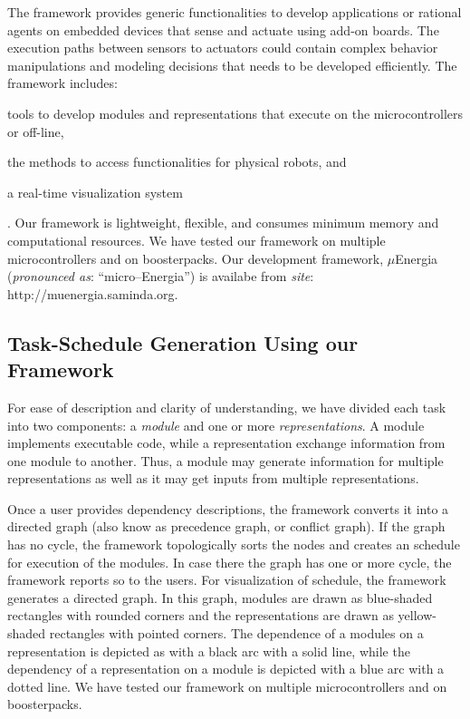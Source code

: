 \documentclass{IEEEtran}
\begin{document}
\par
The framework provides generic functionalities to develop applications or rational agents 
on embedded devices that sense and actuate using add-on boards. The execution paths between sensors 
to actuators could contain complex behavior manipulations and modeling decisions that needs to be 
developed efficiently.
The framework 
includes: \begin{inparaenum}[($i$)] \item tools to develop modules and representations that execute on 
the microcontrollers or off-line, \item the methods to access functionalities for physical robots, 
and \item a real-time visualization system\end{inparaenum}. Our framework is lightweight, flexible, 
and consumes minimum memory and computational resources. We have tested our framework on multiple 
microcontrollers and on boosterpacks. 
Our development framework, $\mu$Energia (\textit{pronounced as}: ``micro--Energia'') is availabe from
\textit{site}:
{http://muenergia.saminda.org}.

\subsection{Task-Schedule Generation Using our Framework}
\label{FrameWorkDescription}


 For ease of description and clarity of understanding, we have divided each task into two components: a {\em module} and one or more {\em representations}. A module implements executable code, while a representation exchange information from one module to another. Thus, a module may generate information for multiple representations as well as it may get inputs from multiple representations. 
\par
Once a user provides dependency descriptions, the framework converts it  into a directed graph (also know as precedence graph, or conflict graph).  If the graph has no cycle, the framework topologically sorts the nodes and creates an schedule for execution of the modules. In case there the graph has one or more cycle, the framework reports so to the users.
For visualization of schedule, the framework  generates a directed graph. In this graph, modules are drawn as blue-shaded rectangles with rounded corners and the representations are drawn as yellow-shaded rectangles with pointed corners. The dependence of a modules on a representation is depicted as with a black arc with a solid line, while the dependency of a representation on a module is depicted with a blue arc with a dotted line. We have tested our framework on multiple 
microcontrollers and on boosterpacks.
\end{document}
